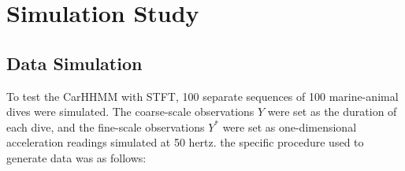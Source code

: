 
\section{Simulation Study}

\subsection{Data Simulation}


To test the CarHHMM with STFT, 100 separate sequences of 100 marine-animal dives were simulated. The coarse-scale observations $Y$ were set as the duration of each dive, and the fine-scale observations $Y^*$ were set as one-dimensional acceleration readings simulated at 50 hertz. the specific procedure used to generate data was as follows: 

